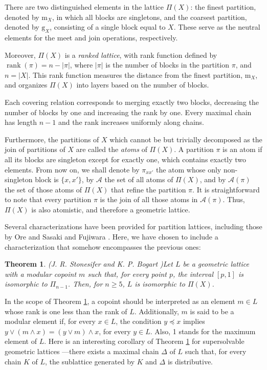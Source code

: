 \documentclass[12pt]{extarticle}
\newtheorem{Theorem}{Theorem}
\begin{document}
	  There are two distinguished elements in the lattice \( \Pi(X) \): the finest partition, denoted by \( \mathrm{m}_X \), in which all blocks are singletons, and the coarsest partition, denoted by \( \mathrm{g}_X \), consisting of a single block equal to \( X \). These serve as the neutral elements for the meet and join operations, respectively.
	 
	 Moreover, \( \Pi(X) \) is a \emph{ranked lattice}, with rank function defined by
	 \(\operatorname{rank}(\pi) = n - |\pi|\),
	 where \( |\pi| \) is the number of blocks in the partition \( \pi \), and \( n = |X| \). This rank function measures the distance from the finest partition, \( \mathrm{m}_X \), and organizes \( \Pi(X) \) into layers based on the number of blocks.
	 
	 Each covering relation corresponds to merging exactly two blocks, decreasing the number of blocks by one and increasing the rank by one. Every maximal chain has length \( n - 1 \) and the rank increases uniformly along chains.
	
 Furthermore, the partitions of $X$ which cannot be but trivially decomposed as the join of partitions of $X$ are called the \emph{atoms} of $\Pi(X)$. A partition $\pi$ is an atom if all its blocks are singleton except for exactly one, which contains exactly two elements. From now on, we shall denote by $\pi_{xx'}$ the atom  whose only non-singleton block is $\{x, x'\}$,  by $\mathcal{A}$ the set of all atoms of $\Pi(X)$, and by $\mathcal{A}(\pi)$ the set of those atoms of $\Pi(X)$ that refine the partition $\pi$. It is straightforward to note that every partition $\pi$ is the join of all those atoms in $\mathcal{A}(\pi)$. Thus, $\Pi(X)$ is also atomistic, and therefore a geometric lattice.
	
	Several characterizations have been provided for partition lattices, including those by Ore \cite{Ore} and Sasaki and Fujiwara \cite{Sasaki}. Here, we have chosen to include a characterization that somehow encompasses the previous ones: 
	
	\begin{Theorem} (J. R. Stonesifer and K. P. Bogart \cite{Stonesifer})\label{JRSKPB} Let $L$ be a geometric lattice with a modular copoint $m$ such that, for every point $p$, the interval $[p,1]$ is isomorphic to $\Pi_{n-1}$. Then, for $n\geq5$, $L$ is isomorphic to $\Pi(X)$.
	\end{Theorem}
	
	In the scope of Theorem \ref{JRSKPB}, a copoint should be interpreted as an element $m\in L$ whose rank is one less than the rank of $L$. Additionally, $m$ is said to be a modular element if, for every $x\in L$, the condition $y\preceq x$ implies $y\vee(m\wedge x)= (y\vee m)\wedge x$, for every $y\in L$. Also, 1 stands for the maximum element of $L$. Here is an interesting corollary of Theorem \ref{JRSKPB} for supersolvable geometric lattices ---there exists a maximal chain $\Delta$ of $L$ such that, for every chain $K$ of $L$, the sublattice generated by $K$ and $\Delta$ is distributive.
	
\end{document}
